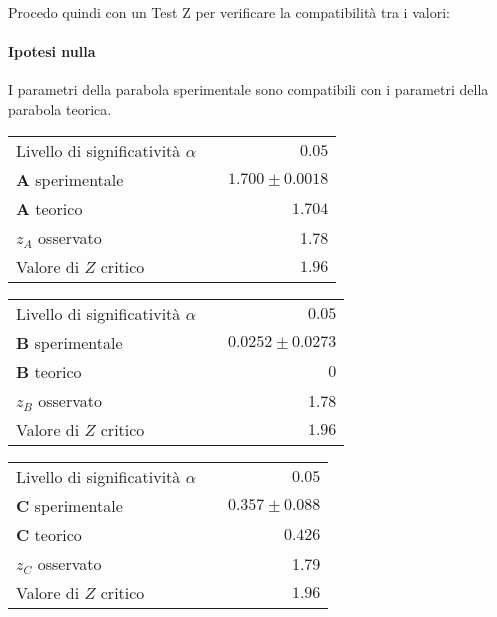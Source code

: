 \documentclass{article}
\begin{document}
\noindent
Procedo quindi con un Test Z per verificare la compatibilità tra i valori:

\paragraph{Ipotesi nulla} I parametri della parabola sperimentale sono compatibili con i parametri della parabola teorica.

\vspace{0.7cm}
\begin{minipage}{0.5\textwidth}
	\begin{table}[H]
		\centering
		\begin{tabular}{lr} 
			Livello di significatività $\alpha$		&$\quad 0.05$  \\
			\textbf{A} sperimentale				& $\quad1.700 \pm 0.0018 $\\
			\textbf{A} teorico					&  $\quad1.704$ \\
			$z_{A}$ osservato 					& $\quad$1.78 \\
			Valore di $Z$ critico     	& $\quad 1.96$
		\end{tabular}
	\end{table}
\end{minipage}
\begin{minipage}{0.5\textwidth}
	\begin{table}[H]
		\centering
		\begin{tabular}{lr} 
			Livello di significatività $\alpha$		&$\quad 0.05$  \\
			\textbf{B} sperimentale				& $\quad0.0252 \pm  0.0273$	\\
			\textbf{B} teorico					& $\quad 0$ \\
			$z_{B}$ osservato 					& $\quad$1.78 \\
			Valore di $Z$ critico     	& $\quad 1.96$
		\end{tabular}
	\end{table}
\end{minipage}

\begin{table}[H]
		\centering
		\begin{tabular}{lr} 
			Livello di significatività $\alpha$		&$\quad 0.05$  \\
			\textbf{C} sperimentale             	& $\quad0.357 \pm 0.088$     \\
			\textbf{C} teorico					&  $\quad 0.426 $\\
			$z_{C}$ osservato					& 1.79 \\ 
			Valore di $Z$ critico     	& $\quad 1.96$
		\end{tabular}
\end{table}
\vspace{0.7cm}
\end{document}
